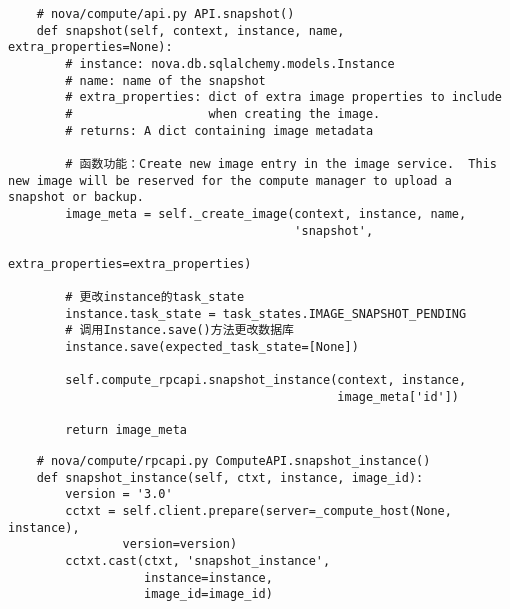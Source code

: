 \documentclass[a4paper,left=1.5cm,right=1.5cm,11pt]{article}
\begin{document}
    \begin{lstlisting}
    # nova/compute/api.py API.snapshot()
    def snapshot(self, context, instance, name, extra_properties=None):
        # instance: nova.db.sqlalchemy.models.Instance
        # name: name of the snapshot
        # extra_properties: dict of extra image properties to include
        #                   when creating the image.
        # returns: A dict containing image metadata

        # 函数功能：Create new image entry in the image service.  This new image will be reserved for the compute manager to upload a snapshot or backup.
        image_meta = self._create_image(context, instance, name,
                                        'snapshot',
                                        extra_properties=extra_properties)

        # 更改instance的task_state
        instance.task_state = task_states.IMAGE_SNAPSHOT_PENDING
        # 调用Instance.save()方法更改数据库
        instance.save(expected_task_state=[None])

        self.compute_rpcapi.snapshot_instance(context, instance,
                                              image_meta['id'])

        return image_meta
    \end{lstlisting}

    \begin{lstlisting}
    # nova/compute/rpcapi.py ComputeAPI.snapshot_instance()
    def snapshot_instance(self, ctxt, instance, image_id):
        version = '3.0'
        cctxt = self.client.prepare(server=_compute_host(None, instance),
                version=version)
        cctxt.cast(ctxt, 'snapshot_instance',
                   instance=instance,
                   image_id=image_id)
    \end{lstlisting}
\end{document}
